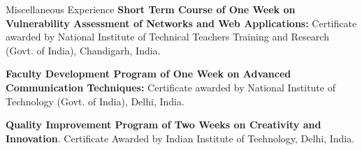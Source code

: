 \begin{rubric}{Miscellaneous Experience}
    \entry*[2016] \textbf{Short Term Course of One Week on Vulnerability Assessment of Networks and Web Applications:} Certificate awarded by National Institute of Technical Teachers Training and Research (Govt. of India), Chandigarh, India.
    
    \entry*[2013] \textbf{Faculty Development Program of One Week on Advanced Communication Techniques:} Certificate awarded by National Institute of Technology (Govt. of India), Delhi, India.
    
    \entry*[2012] \textbf{Quality Improvement Program of Two Weeks on Creativity and Innovation}. Certificate Awarded by Indian Institute of Technology, Delhi, India.
    \end{rubric}